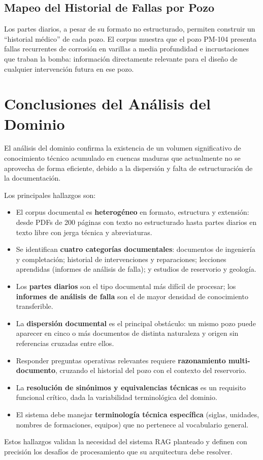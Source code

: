 \documentclass[12pt, a4paper]{article}
\begin{document}
\subsection{Mapeo del Historial de Fallas por Pozo}

Los partes diarios, a pesar de su formato no estructurado, permiten construir un ``historial
m\'{e}dico'' de cada pozo. El corpus muestra que el pozo PM-104 presenta fallas recurrentes
de corrosi\'{o}n en varillas a media profundidad e incrustaciones que traban la bomba:
informaci\'{o}n directamente relevante para el dise\~{n}o de cualquier intervenci\'{o}n
futura en ese pozo.

\section{Conclusiones del An\'{a}lisis del Dominio}

El an\'{a}lisis del dominio confirma la existencia de un volumen significativo de conocimiento
t\'{e}cnico acumulado en cuencas maduras que actualmente no se aprovecha de forma eficiente,
debido a la dispersi\'{o}n y falta de estructuraci\'{o}n de la documentaci\'{o}n.

Los principales hallazgos son:

\begin{itemize}
  \item El corpus documental es \textbf{heterog\'{e}neo} en formato, estructura y extensi\'{o}n:
        desde PDFs de 200 p\'{a}ginas con texto no estructurado hasta partes diarios en texto
        libre con jerga t\'{e}cnica y abreviaturas.
  \item Se identifican \textbf{cuatro categor\'{i}as documentales}: documentos de
        ingenier\'{i}a y completaci\'{o}n; historial de intervenciones y reparaciones;
        lecciones aprendidas (informes de an\'{a}lisis de falla); y estudios de reservorio y
        geolog\'{i}a.
  \item Los \textbf{partes diarios} son el tipo documental m\'{a}s dif\'{i}cil de procesar;
        los \textbf{informes de an\'{a}lisis de falla} son el de mayor densidad de conocimiento
        transferible.
  \item La \textbf{dispersi\'{o}n documental} es el principal obst\'{a}culo: un mismo pozo
        puede aparecer en cinco o m\'{a}s documentos de distinta naturaleza y origen sin
        referencias cruzadas entre ellos.
  \item Responder preguntas operativas relevantes requiere \textbf{razonamiento
        multi-documento}, cruzando el historial del pozo con el contexto del reservorio.
  \item La \textbf{resoluci\'{o}n de sin\'{o}nimos y equivalencias t\'{e}cnicas} es un
        requisito funcional cr\'{i}tico, dada la variabilidad terminol\'{o}gica del dominio.
  \item El sistema debe manejar \textbf{terminolog\'{i}a t\'{e}cnica espec\'{i}fica} (siglas,
        unidades, nombres de formaciones, equipos) que no pertenece al vocabulario general.
\end{itemize}

Estos hallazgos validan la necesidad del sistema RAG planteado y definen con precisi\'{o}n
los desaf\'{i}os de procesamiento que su arquitectura debe resolver.
\end{document}

